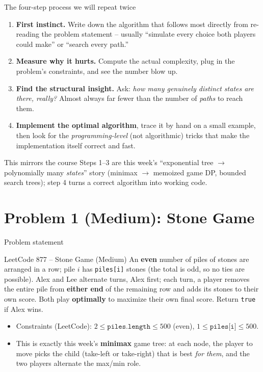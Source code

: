 \documentclass[11pt,aspectratio=169]{beamer}
\begin{document}
\begin{frame}{The four-step process we will repeat twice}
  \begin{enumerate}
    \item \textbf{First instinct.} Write down the algorithm that follows most directly
    from re-reading the problem statement -- usually ``simulate every choice both
    players could make'' or ``search every path.''
    \item \textbf{Measure why it hurts.} Compute the actual complexity, plug in the
    problem's constraints, and see the number blow up.
    \item \textbf{Find the structural insight.} Ask: \emph{how many genuinely distinct
    states are there, really?} Almost always far fewer than the number of \emph{paths}
    to reach them.
    \item \textbf{Implement the optimal algorithm}, trace it by hand on a small example,
    then look for the \emph{programming-level} (not algorithmic) tricks that make the
    implementation itself correct and fast.
  \end{enumerate}
  \begin{alertblock}{This mirrors the course}
    Steps 1--3 are this week's ``exponential tree $\to$ polynomially many \emph{states}''
    story (minimax $\to$ memoized game DP, bounded search trees); step 4 turns a correct
    algorithm into working code.
  \end{alertblock}
\end{frame}

\section{Problem 1 (Medium): Stone Game}

\begin{frame}{Problem statement}
  \begin{block}{LeetCode 877 -- Stone Game (\textcolor{blue!50!black}{Medium})}
    An \textbf{even} number of piles of stones are arranged in a row; pile $i$ has
    \texttt{piles[i]} stones (the total is odd, so no ties are possible). Alex and Lee
    alternate turns, Alex first; each turn, a player removes the entire pile from
    \textbf{either end} of the remaining row and adds its stones to their own score.
    Both play \textbf{optimally} to maximize their own final score. Return
    \texttt{true} if Alex wins.
  \end{block}
  \begin{itemize}
    \item Constraints (LeetCode): $2 \le \texttt{piles.length} \le 500$ (even),
    $1 \le \texttt{piles[i]} \le 500$.
    \item This is exactly this week's \textbf{minimax} game tree: at each node, the
    player to move picks the child (take-left or take-right) that is best \emph{for
    them}, and the two players alternate the max/min role.
  \end{itemize}
\end{frame}
\end{document}
